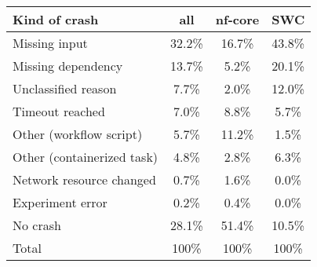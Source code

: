 \begin{tabular}{p{1.7in}ccc}
    Kind of crash & all & nf-core & SWC \\
    \midrule
    Missing input & 32.2\% & 16.7\% & 43.8\% \\
    Missing dependency & 13.7\% & 5.2\% & 20.1\% \\
    Unclassified reason & 7.7\% & 2.0\% & 12.0\% \\
    Timeout reached & 7.0\% & 8.8\% & 5.7\% \\
    Other (workflow script) & 5.7\% & 11.2\% & 1.5\% \\
    Other (containerized task) & 4.8\% & 2.8\% & 6.3\% \\
    Network resource changed & 0.7\% & 1.6\% & 0.0\% \\
    Experiment error & 0.2\% & 0.4\% & 0.0\% \\
    \midrule No crash & 28.1\% & 51.4\% & 10.5\% \\
    \midrule Total & 100\% & 100\% & 100\% \\\end{tabular}